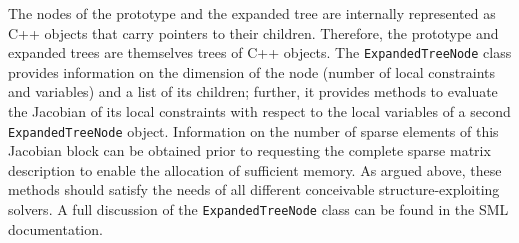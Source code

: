 \documentclass[10pt,a4paper]{book}
\begin{document}
The nodes of the prototype and the expanded tree are internally
represented as C++ objects that carry pointers to their children. 
Therefore, the prototype and expanded trees are themselves trees of C++ objects.
The {\tt ExpandedTreeNode} class provides information on the dimension
of the node (number of local constraints and variables) and a list of
its children; further, it provides methods to evaluate the Jacobian of
its local constraints with respect to the local variables of a second
{\tt ExpandedTreeNode} object. Information on the number of sparse
elements of this Jacobian block can be obtained prior to requesting
the complete sparse matrix description to enable the allocation of
sufficient memory. As argued above, these methods should satisfy
the needs of all different conceivable structure-exploiting solvers. A
full discussion of the {\tt ExpandedTreeNode} class can be found in
the SML documentation.




%
%
\end{document}
